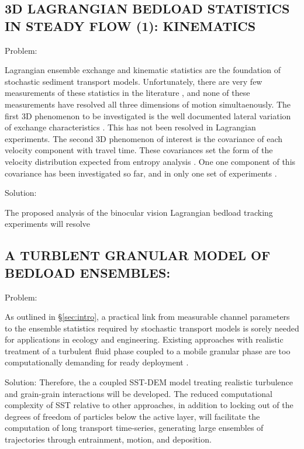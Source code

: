\subsection{3D LAGRANGIAN BEDLOAD STATISTICS IN STEADY FLOW (1): KINEMATICS}

Problem: 

Lagrangian ensemble exchange and kinematic statistics are the foundation of stochastic sediment transport models. Unfortunately, there are very few measurements of these statistics in the literature \citep{Ancey2006, Lajeunesse2010, Roseberry2012, Heyman2013, Fathel2015,Heyman2016}, and none of these measurements have resolved all three dimensions of motion simultaenously. The first 3D phenomenon to be investigated is the well documented lateral variation of exchange characteristics \citep{Nelson2010, Hodge2013, Venditti2017}. This has not been resolved in Lagrangian experiments. The second 3D phenomenon of interest is the covariance of each velocity component with travel time. These covariances set the form of the velocity distribution expected from entropy analysis \citep{Furbish2013, Furbish2016}. One one component of this covariance has been investigated so far, and in only one set of experiments \citep{Fathel2015}. 
\bigskip 

Solution:
 
The proposed analysis of the binocular vision Lagrangian bedload tracking experiments will resolve 



\subsection{A TURBLENT GRANULAR MODEL OF BEDLOAD ENSEMBLES:} \label{proj:SSTDEM}

Problem: 

As outlined in \S \ref{sec:intro}, a practical link from measurable channel parameters to the ensemble statistics required by stochastic transport models is sorely needed for applications in ecology and engineering. Existing approaches with realistic treatment of a turbulent fluid phase coupled to a mobile granular phase are too computationally demanding for ready deployment \citep[e.g.][]{Schmeeckle2014,Elghannay2017}. 
\bigskip 

Solution: 
Therefore, the a coupled SST-DEM model treating realistic turbulence and grain-grain interactions will be developed. The reduced computational complexity of SST relative to other approaches, in addition to locking out of the degrees of freedom of particles below the active layer, will facilitate the computation of long transport time-series, generating large ensembles of trajectories through entrainment, motion, and deposition. 
\bigskip 

